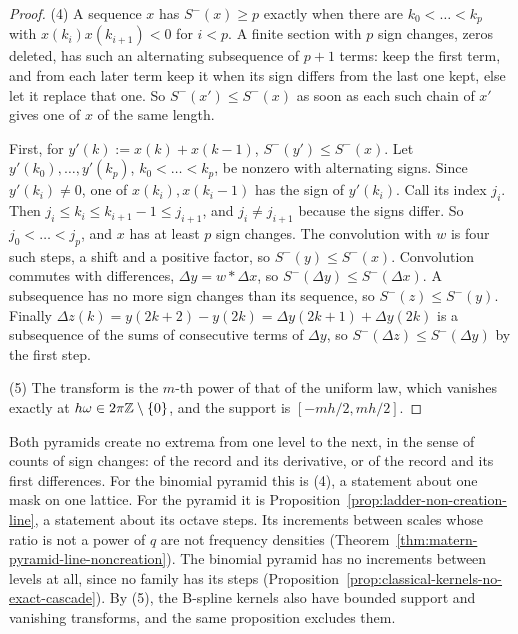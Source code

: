 \begin{proof}
(4) A sequence $x$ has $S^-(x) \ge p$ exactly when there are $k_0 < \dots < k_p$ with
$x(k_i)x(k_{i+1}) < 0$ for $i < p$. A finite section with $p$ sign changes, zeros deleted, has such
an alternating subsequence of $p + 1$ terms: keep the first term, and from each later term keep
it when its sign differs from the last one kept, else let it replace that one. So
$S^-(x') \le S^-(x)$ as soon as each such chain of $x'$ gives one of $x$ of the same length.

First, for $y'(k) := x(k) + x(k-1)$, $S^-(y') \le S^-(x)$. Let
$y'(k_0), \dots, y'(k_p)$, $k_0 < \dots < k_p$, be nonzero with alternating signs. Since
$y'(k_i) \ne 0$, one of $x(k_i), x(k_i - 1)$ has the sign of $y'(k_i)$. Call its index $j_i$. Then
$j_i \le k_i \le k_{i+1} - 1 \le j_{i+1}$, and $j_i \ne j_{i+1}$ because the signs differ. So
$j_0 < \dots < j_p$, and $x$ has at least $p$ sign changes. The convolution with $w$ is four such
steps, a shift and a positive factor, so $S^-(y) \le S^-(x)$. Convolution commutes with
differences, $\Delta y = w * \Delta x$, so $S^-(\Delta y) \le S^-(\Delta x)$. A subsequence has no
more sign changes than its sequence, so $S^-(z) \le S^-(y)$. Finally
$\Delta z(k) = y(2k+2) - y(2k) = \Delta y(2k+1) + \Delta y(2k)$ is a subsequence of the sums of
consecutive terms of $\Delta y$, so $S^-(\Delta z) \le S^-(\Delta y)$ by the first step.

(5) The transform is the $m$-th power of that of the uniform law, which vanishes exactly at
$h\omega \in 2\pi\mathbb{Z} \setminus \{0\}$, and the support is $[-mh/2, mh/2]$.
\end{proof}

Both pyramids create no extrema from one level to the next, in the sense of counts of sign
changes: of the record and its derivative, or of the record and its first differences. For the
binomial pyramid this is (4), a statement about one mask on one lattice. For the \Matern{} pyramid it is
Proposition~\ref{prop:ladder-non-creation-line}, a statement about its octave steps. Its increments
between scales whose ratio is not a power of $q$ are not \Polya{} frequency densities
(Theorem~\ref{thm:matern-pyramid-line-noncreation}). The binomial pyramid
has no increments between levels at all, since no family has its steps
(Proposition~\ref{prop:classical-kernels-no-exact-cascade}). By (5), the B-spline kernels also have
bounded support and vanishing transforms, and the same proposition excludes them.

